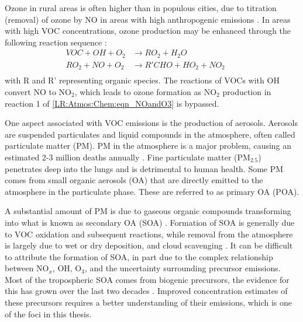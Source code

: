   Ozone in rural areas is often higher than in populous cities, due to titration (removal) of ozone by NO in areas with high anthropogenic emissions \parencite{Cooper2014,Monks2015}.
  In areas with high VOC concentrations, ozone production may be enhanced through the following reaction sequence \parencite{Sillman1999}:
  \begin{equation}
    \begin{aligned}
      VOC + OH + O_2   & \to RO_2 + H_2O       && \\%
      RO_2 + NO + O_2  & \to R'CHO+HO_2+NO_2   && \\%
    \end{aligned}
    \label{LR:VOCs:eqn_VOCandNO}
  \end{equation}
  with R and R' representing organic species.
  The reactions of VOCs with OH convert NO to NO$_2$, which leads to ozone formation as NO$_2$ production in reaction 1 of \ref{LR:Atmos:Chem:eqn_NOandO3} is bypassed.
  
  One aspect associated with VOC emissions is the production of aerosols.
  Aerosols are suspended particulates and liquid compounds in the atmosphere, often called particulate matter (PM).
  PM in the atmosphere is a major problem, causing an estimated 2-3 million deaths annually \parencite{Hoek2013, Krewski2009, Silva2013, Lelieveld2015}. 
  Fine particulate matter (PM$_{2.5}$) penetrates deep into the lungs and is detrimental to human health.
  Some PM comes from small organic aerosols (OA) that are directly emitted to the atmosphere in the particulate phase. 
  These are referred to as primary OA (POA).
  
  A substantial amount of PM is due to gaseous organic compounds transforming into what is known as secondary OA (SOA) \parencite{Kroll2008}.
  Formation of SOA is generally due to VOC oxidation and subsequent reactions, while removal from the atmosphere is largely due to wet or dry deposition, and cloud scavenging \parencite{Kanakidou2005}.
  It can be difficult to attribute the formation of SOA, in part due to the complex relationship between NO$_x$, OH, O$_3$, and the uncertainty surrounding precursor emissions.
  Most of the tropospheric SOA comes from biogenic precursors, the evidence for this has grown over the last two decades \parencite{Guenther1995, Kanakidou2005,Guenther2012}.
  Improved concentration estimates of these precursors requires a better understanding of their emissions, which is one of the foci in this thesis.
  
